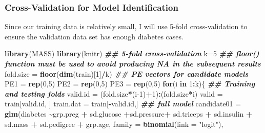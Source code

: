 \documentclass[
]{book}
\newenvironment{Shaded}{\begin{snugshade}}{\end{snugshade}}
\newcommand{\AttributeTok}[1]{\textcolor[rgb]{0.13,0.29,0.53}{#1}}
\newcommand{\ControlFlowTok}[1]{\textcolor[rgb]{0.13,0.29,0.53}{\textbf{#1}}}
\newcommand{\DecValTok}[1]{\textcolor[rgb]{0.00,0.00,0.81}{#1}}
\newcommand{\DocumentationTok}[1]{\textcolor[rgb]{0.56,0.35,0.01}{\textbf{\textit{#1}}}}
\newcommand{\FunctionTok}[1]{\textcolor[rgb]{0.13,0.29,0.53}{\textbf{#1}}}
\newcommand{\NormalTok}[1]{#1}
\newcommand{\OtherTok}[1]{\textcolor[rgb]{0.56,0.35,0.01}{#1}}
\newcommand{\SpecialCharTok}[1]{\textcolor[rgb]{0.81,0.36,0.00}{\textbf{#1}}}
\newcommand{\StringTok}[1]{\textcolor[rgb]{0.31,0.60,0.02}{#1}}
\begin{document}
\hypertarget{cross-validation-for-model-identification}{%
\subsubsection{Cross-Validation for Model Identification}\label{cross-validation-for-model-identification}}

Since our training data is relatively small, I will use 5-fold cross-validation to ensure the validation data set has enough diabetes cases.

\begin{Shaded}
\begin{Highlighting}[]
\FunctionTok{library}\NormalTok{(MASS)}
\FunctionTok{library}\NormalTok{(knitr)}
\DocumentationTok{\#\# 5{-}fold cross{-}validation}
\NormalTok{k}\OtherTok{=}\DecValTok{5}
\DocumentationTok{\#\# floor() function must be used to avoid producing NA in the subsequent results}
\NormalTok{fold.size }\OtherTok{=} \FunctionTok{floor}\NormalTok{(}\FunctionTok{dim}\NormalTok{(train)[}\DecValTok{1}\NormalTok{]}\SpecialCharTok{/}\NormalTok{k)}
\DocumentationTok{\#\# PE vectors for candidate models}
\NormalTok{PE1 }\OtherTok{=} \FunctionTok{rep}\NormalTok{(}\DecValTok{0}\NormalTok{,}\DecValTok{5}\NormalTok{)}
\NormalTok{PE2 }\OtherTok{=} \FunctionTok{rep}\NormalTok{(}\DecValTok{0}\NormalTok{,}\DecValTok{5}\NormalTok{)}
\NormalTok{PE3 }\OtherTok{=} \FunctionTok{rep}\NormalTok{(}\DecValTok{0}\NormalTok{,}\DecValTok{5}\NormalTok{)}
\ControlFlowTok{for}\NormalTok{(i }\ControlFlowTok{in} \DecValTok{1}\SpecialCharTok{:}\NormalTok{k)\{}
  \DocumentationTok{\#\# Training and testing folds}
\NormalTok{  valid.id }\OtherTok{=}\NormalTok{ (fold.size}\SpecialCharTok{*}\NormalTok{(i}\DecValTok{{-}1}\NormalTok{)}\SpecialCharTok{+}\DecValTok{1}\NormalTok{)}\SpecialCharTok{:}\NormalTok{(fold.size}\SpecialCharTok{*}\NormalTok{i)}
\NormalTok{  valid }\OtherTok{=}\NormalTok{ train[valid.id, ]}
\NormalTok{  train.dat }\OtherTok{=}\NormalTok{ train[}\SpecialCharTok{{-}}\NormalTok{valid.id,]}
  \DocumentationTok{\#\#  full model}
\NormalTok{  candidate01 }\OtherTok{=} \FunctionTok{glm}\NormalTok{(diabetes }\SpecialCharTok{\textasciitilde{}}\NormalTok{grp.preg }\SpecialCharTok{+}\NormalTok{ sd.glucose }\SpecialCharTok{+}\NormalTok{sd.pressure}\SpecialCharTok{+}\NormalTok{ sd.triceps }\SpecialCharTok{+}\NormalTok{ sd.insulin }\SpecialCharTok{+} 
\NormalTok{                    sd.mass }\SpecialCharTok{+}\NormalTok{ sd.pedigree }\SpecialCharTok{+}\NormalTok{ grp.age, }\AttributeTok{family =} \FunctionTok{binomial}\NormalTok{(}\AttributeTok{link =} \StringTok{"logit"}\NormalTok{),  }

\end{Highlighting}
\end{Shaded}
\end{document}
